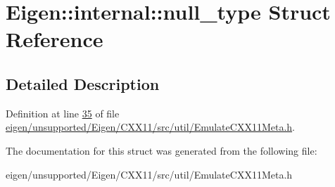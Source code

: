 \hypertarget{struct_eigen_1_1internal_1_1null__type}{}\section{Eigen\+:\+:internal\+:\+:null\+\_\+type Struct Reference}
\label{struct_eigen_1_1internal_1_1null__type}


\subsection{Detailed Description}


Definition at line \hyperlink{eigen_2unsupported_2_eigen_2_c_x_x11_2src_2util_2_emulate_c_x_x11_meta_8h_source_l00035}{35} of file \hyperlink{eigen_2unsupported_2_eigen_2_c_x_x11_2src_2util_2_emulate_c_x_x11_meta_8h_source}{eigen/unsupported/\+Eigen/\+C\+X\+X11/src/util/\+Emulate\+C\+X\+X11\+Meta.\+h}.



The documentation for this struct was generated from the following file\+:\begin{DoxyCompactItemize}
\item 
eigen/unsupported/\+Eigen/\+C\+X\+X11/src/util/\+Emulate\+C\+X\+X11\+Meta.\+h\end{DoxyCompactItemize}
